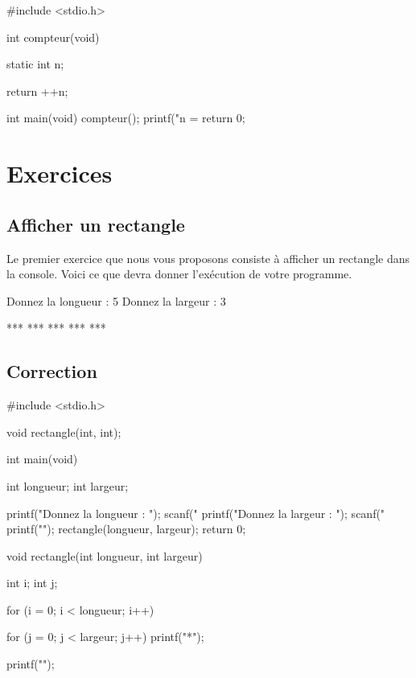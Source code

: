\begin{C}
#include <stdio.h>


int compteur(void)
{
    static int n;

    return ++n;
}


int main(void)
{
    compteur();
    printf("n = %
    return 0;
}

\end{C}


\section{Exercices}
\label{exercices-3}

\subsection{Afficher un rectangle}
\label{afficher-un-rectangle}

Le premier exercice que nous vous proposons consiste à afficher un
rectangle dans la console. Voici ce que devra donner l'exécution de
votre programme.

\begin{C}
Donnez la longueur : 5
Donnez la largeur : 3

***
***
***
***
***
\end{C}

\subsection{Correction}
\label{correction-10}

\begin{C}
 #include <stdio.h>

void rectangle(int, int);


int main(void)
{
    int longueur;
    int largeur;

    printf("Donnez la longueur : ");
    scanf("%
    printf("Donnez la largeur : ");
    scanf("%
    printf("\n");
    rectangle(longueur, largeur);
    return 0;
}


void rectangle(int longueur, int largeur)
{
    int i;
    int j;

    for (i = 0; i < longueur; i++)
    {
        for (j = 0; j < largeur; j++)
            printf("*");

        printf("\n");
    }
}
\end{C}

